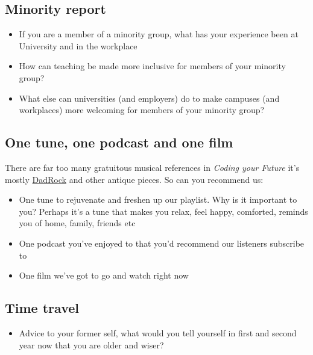 \documentclass[
]{book}
\providecommand{\tightlist}{%
  \setlength{\itemsep}{0pt}\setlength{\parskip}{0pt}}
\begin{document}
\hypertarget{minority}{%
\subsection{Minority report}\label{minority}}

\begin{itemize}
\tightlist
\item
  If you are a member of a minority group, what has your experience been at University and in the workplace
\item
  How can teaching be made more inclusive for members of your minority group?
\item
  What else can universities (and employers) do to make campuses (and workplaces) more welcoming for members of your minority group?
\end{itemize}

\hypertarget{otopof}{%
\subsection{One tune, one podcast and one film}\label{otopof}}

There are far too many gratuitous musical references in \emph{Coding your Future} it's mostly \href{https://www.esquire.com/entertainment/music/a29419783/what-is-dad-rock/}{DadRock} and other antique pieces. \citep{dadrock} So can you recommend us:

\begin{itemize}
\tightlist
\item
  One tune to rejuvenate and freshen up our playlist. Why is it important to you? Perhaps it's a tune that makes you relax, feel happy, comforted, reminds you of home, family, friends etc
\item
  One podcast you've enjoyed to that you'd recommend our listeners subscribe to
\item
  One film we've got to go and watch right now
\end{itemize}

\hypertarget{time-travel}{%
\subsection{Time travel}\label{time-travel}}

\begin{itemize}
\tightlist
\item
  Advice to your former self, what would you tell yourself in first and second year now that you are older and wiser?
\end{itemize}
\end{document}

